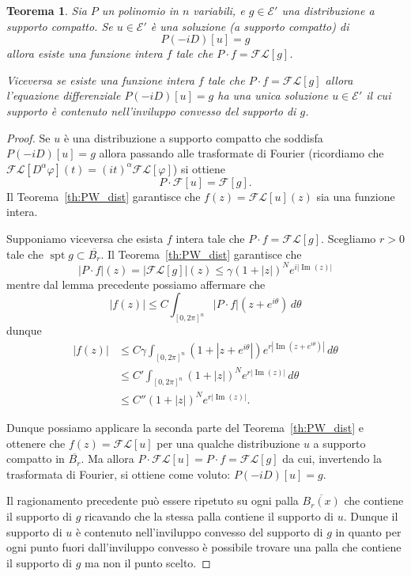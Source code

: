 \documentclass[italian,a4paper,oneside,headinclude]{scrbook}
\renewcommand{\phi}{\varphi}
\newcommand{\E}{\mathcal E}
\newcommand{\F}{\mathcal F}
\newcommand{\FL}{\mathcal F\!\mathcal L}
\newcommand{\abs}[1]{{\left|#1\right|}}
\DeclareMathOperator{\spt}{spt}
\DeclareMathOperator{\Imaginarypart}{Im}
\renewcommand{\Im}{\Imaginarypart}
\newtheorem{theorem}{Teorema}
\begin{document}
\begin{theorem}
  Sia $P$ un polinomio in $n$ variabili, e $g \in \E'$ una
  distribuzione a supporto compatto.
  Se $u\in \E'$ è una soluzione (a supporto compatto) di
  \[
  P(-iD) [u] = g
  \]
  allora
  esiste una funzione intera $f$ tale che $P\cdot f = \FL[g]$.

  Viceversa se esiste una funzione intera
  $f$ tale che $P\cdot f = \FL[g]$
  allora l'equazione differenziale
  $P(-iD) [u]= g$
  ha una unica soluzione $u\in \E'$
  il cui supporto è contenuto nell'inviluppo convesso del supporto di $g$.
\end{theorem}
%
\begin{proof}
  Se $u$ è una distribuzione a supporto compatto che soddisfa
  $P(-iD)[u] = g$ allora passando alle trasformate di Fourier
  (ricordiamo che $\FL[D^\alpha \phi](t) = (it)^\alpha \FL[\phi]$)
  si ottiene
  \[
  P\cdot \F[u] = \F[g].
  \]
  Il Teorema~\ref{th:PW_dist} garantisce che $f(z)=\FL[u](z)$ sia una funzione
  intera.

  Supponiamo viceversa che esista $f$ intera tale che
  $P\cdot f = \FL[g]$.
  Scegliamo $r>0$ tale che $\spt g \subset \overline{B_r}$.
  Il Teorema~\ref{th:PW_dist} garantisce che
  \[
  \abs{P\cdot f}(z) = \abs{\FL[g]}(z) \le \gamma (1+\abs{z})^N e^{i\abs{\Im(z)}}
  \]
  mentre dal lemma precedente possiamo affermare che
  \[
  \abs{f(z)}
  \le C \int_{[0,2\pi]^n} \abs{P\cdot f}(z+e^{i\theta})\,  d\theta
  \]
  dunque
  \begin{align*}
    \abs{f(z)}
    &\le C\gamma \int_{[0,2\pi]^n}(1+\abs{z+e^{i\theta}})
      e^{r\abs{\Im(z+e^{i\theta})}}\, d \theta \\
    &\le C' \int_{[0,2\pi]^n}(1+\abs{z})^N e^{r\abs{\Im(z)}}\, d\theta
        \\
    &\le C'' (1+\abs{z})^N e^{r\abs{\Im(z)}}.
  \end{align*}

  Dunque possiamo applicare la seconda parte del
  Teorema~\ref{th:PW_dist}
  e ottenere che $f(z) = \FL[u]$ per una qualche distribuzione $u$ a
  supporto compatto in $\overline{B_r}$.
  Ma allora $P\cdot \FL[u] =  P\cdot f = \FL[g]$
  da cui, invertendo la trasformata di Fourier, si
  ottiene come voluto: $P(-iD)[u] = g$.

  Il ragionamento precedente può essere ripetuto su ogni palla
  $\overline{B_r(x)}$ che contiene il supporto di $g$ ricavando che la
  stessa palla contiene il supporto di $u$. Dunque il supporto di $u$
  è contenuto nell'inviluppo convesso del supporto di $g$ in quanto
  per ogni punto fuori dall'inviluppo convesso è possibile trovare una
  palla che contiene il supporto di $g$ ma non il punto scelto.
\end{proof}
\end{document}
